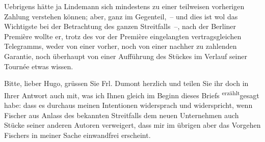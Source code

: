 \pstart
           Uebrigens hätte ja Lindemann sich mindestens
               zu einer teilweisen vorherigen Zahlung verstehen können; aber, ganz im Gegenteil, –
               und dies ist wol das Wichtigste bei der Betrachtung des ganzen Streitfalls –, nach
               der Berliner Première wollte er, trotz des vor
               der Première eingelangten vertragsgleichen Telegramms, weder von einer vorher, noch
               von einer nachher zu zahlenden Garantie, noch überhaupt von einer Aufführung des Stückes im Verlauf seiner
               Tournée etwas wissen.\pend
           
\pstart
           {\pb}Bitte, lieber Hugo, grüssen Sie Frl. Dumont herzlich und teilen Sie ihr doch in
               Ihrer Antwort auch mit, was ich Ihnen gleich im Beginn dieses Briefs \substVorne{}\textsuperscript{erzählt}\substDazwischen{}gesagt\substHinten{} habe: dass es durchaus meinen Intentionen widersprach und widerspricht, wenn
                  Fischer aus Anlass des bekannten
               Streitfalls dem neuen Unternehmen auch Stücke seiner anderen Autoren verweigert, dass
               mir im übrigen aber das Vorgehen Fischers in
               meiner Sache einwandfrei erscheint.\pend
           
